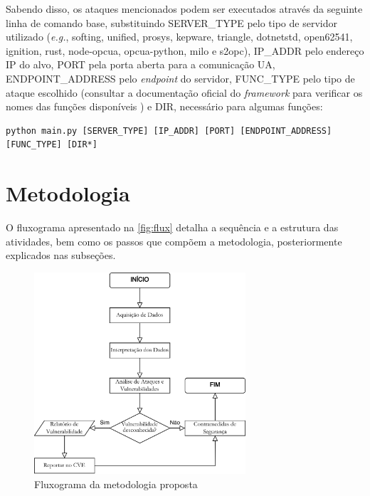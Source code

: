         Sabendo disso, os ataques mencionados podem ser executados através da seguinte linha de comando base, substituindo SERVER\_TYPE pelo tipo de servidor utilizado (\textit{e.g.}, softing, unified, prosys, kepware, triangle, dotnetstd, open62541, ignition, rust, node-opcua, opcua-python, milo e s2opc), IP\_ADDR pelo endereço IP do alvo, PORT pela porta aberta para a comunicação UA, ENDPOINT\_ADDRESS pelo \textit{endpoint} do servidor, FUNC\_TYPE pelo tipo de ataque escolhido (consultar a documentação oficial do \textit{framework} para verificar os nomes das funções disponíveis \cite{claroty2023}) e DIR, necessário para algumas funções:

        \begin{verbatim}
python main.py [SERVER_TYPE] [IP_ADDR] [PORT] [ENDPOINT_ADDRESS] [FUNC_TYPE] [DIR*]
        \end{verbatim}

\section{Metodologia}

    O fluxograma apresentado na \autoref{fig:flux} detalha a sequência e a estrutura das atividades, bem como os passos que compõem a metodologia, posteriormente explicados nas subseções.
    
    \begin{figure}[htbp!]
        \caption{\label{fig:flux}Fluxograma da metodologia proposta}
        \begin{center}
            \includegraphics[width=0.7\textwidth]{USPSC-img/fluxograma.png}
        \end{center}
    \end{figure}

